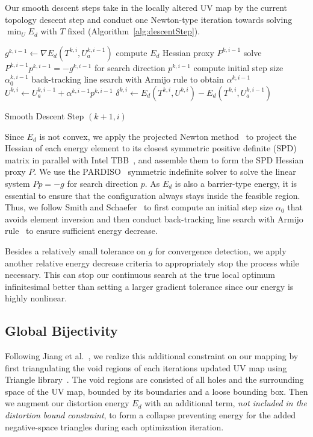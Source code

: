 Our smooth descent steps take in the locally altered UV map by the current topology descent step and conduct one Newton-type iteration towards solving $\min_U E_d$ with $T$ fixed (Algorithm~\ref{alg:descentStep}).

\begin{algorithm}[h]
\SetAlgoLined
{}
$g^{k,i-1} \leftarrow \nabla E_{d}(T^{k,i}, U_a^{k,i-1})$\;
compute $E_{d}$ Hessian proxy $P^{k,i-1}$\;
solve $P^{k,i-1} p^{k,i-1} = -g^{k,i-1}$ for search direction $p^{k,i-1}$\;
compute initial step size $\alpha^{k,i-1}_0$\;
back-tracking line search with Armijo rule to obtain $\alpha^{k,i-1}$\;
$U^{k,i} \leftarrow U_a^{k,i-1} + \alpha^{k,i-1} p^{k,i-1}$\;
$\delta^{k,i} \leftarrow E_{d}(T^{k,i}, U^{k,i}) - E_{d}(T^{k,i}, U_a^{k,i-1})$\;
\caption{Smooth Descent Step $(k+1,i)$}
\label{alg:descentStep}
\end{algorithm}
Since $E_{d}$ is not convex, we apply the projected Newton method\ \cite{Teran2005Robust} to project the Hessian of each energy element to its closest symmetric positive definite (SPD) matrix in parallel with Intel TBB~\cite{Reinders2007Intel}, and assemble them to form the SPD Hessian proxy $P$. We use the PARDISO~\cite{pardiso-6.0a, pardiso-6.0b} symmetric indefinite solver to solve the linear system $P p = -g$ for search direction $p$.  As $E_{d}$ is also a barrier-type energy, it is essential to ensure that the configuration always stays inside the feasible region. Thus, we follow Smith and Schaefer~ to first compute an initial step size $\alpha_0$ that avoids element inversion and then conduct back-tracking line search with Armijo rule~\cite{Armijo1966Minimization} to ensure sufficient energy decrease.

Besides a relatively small tolerance on $g$ for convergence detection, we apply another relative energy decrease criteria to appropriately stop the process while necessary.
This can stop our continuous search at the true local optimum infinitesimal better than setting a larger gradient tolerance since our energy is highly nonlinear.

\subsection{Global Bijectivity}
\label{sec:bijectivity}
Following Jiang et al.\ , we realize this additional constraint on our mapping by first triangulating the void regions of each iterations updated UV map using Triangle library\ \cite{Triangle_Engineering_a_2D_quality_mesh_generator_and_Delaunay_triangulator}. The void regions are consisted of all holes and the surrounding space of the UV map, bounded by its boundaries and a loose bounding box.
Then we augment our distortion energy $E_d$ with an additional term, \emph{not included in the distortion bound constraint}, to form a collapse preventing energy for the added negative-space triangles during each optimization iteration.

